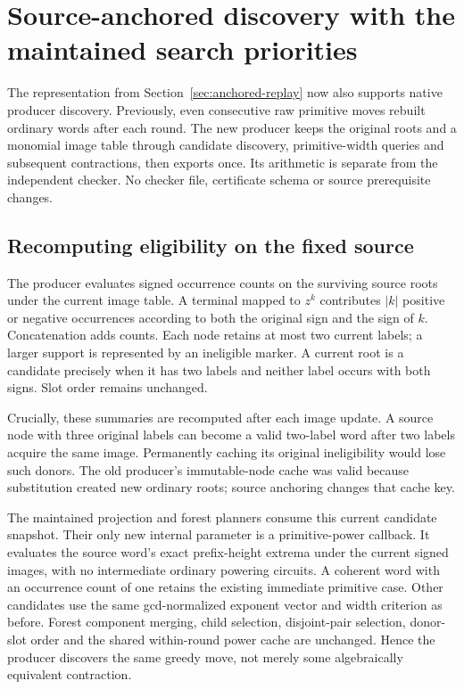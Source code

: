\section{Source-anchored discovery with the maintained search priorities}
\label{sec:anchored-producer}

The representation from Section~\ref{sec:anchored-replay} now also supports
native producer discovery. Previously, even consecutive raw primitive moves
rebuilt ordinary words after each round. The new producer keeps the original
roots and a monomial image table through candidate discovery, primitive-width
queries and subsequent contractions, then exports once. Its arithmetic is
separate from the independent checker. No checker file, certificate schema
or source prerequisite changes.

\subsection{Recomputing eligibility on the fixed source}

The producer evaluates signed occurrence counts on the surviving source
roots under the current image table. A terminal mapped to $z^k$ contributes
$|k|$ positive or negative occurrences according to both the original sign
and the sign of $k$. Concatenation adds counts. Each node retains at most two
current labels; a larger support is represented by an ineligible marker.
A current root is a candidate precisely when it has two labels and neither
label occurs with both signs. Slot order remains unchanged.

Crucially, these summaries are recomputed after each image update. A source
node with three original labels can become a valid two-label word after two
labels acquire the same image. Permanently caching its original ineligibility
would lose such donors. The old producer's immutable-node cache was valid
because substitution created new ordinary roots; source anchoring changes
that cache key.

The maintained projection and forest planners consume this current candidate
snapshot. Their only new internal parameter is a primitive-power callback.
It evaluates the source word's exact prefix-height extrema under the current
signed images, with no intermediate ordinary powering circuits. A coherent
word with an occurrence count of one retains the existing immediate primitive
case. Other candidates use the same gcd-normalized exponent vector and width
criterion as before. Forest component merging, child selection, disjoint-pair
selection, donor-slot order and the shared within-round power cache are
unchanged. Hence the producer discovers the same greedy move, not merely
some algebraically equivalent contraction.

